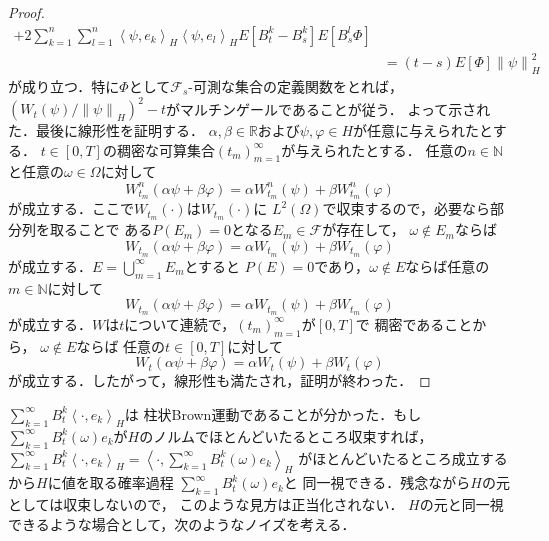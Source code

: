 \documentclass[dvipdfmx,autodetect-engine]{jsarticle}
\theoremstyle{remark}
\theoremstyle{definition}
\newcommand{\R}{\mathbb{R}}
\newcommand{\N}{\mathbb{N}}
\newcommand{\norm}[1]{\left\lVert#1\right\rVert}
\newcommand{\paren}[1]{\left( #1 \right)}
\newcommand{\iprod}[1]{\left\langle #1 \right\rangle}
\begin{document}
\begin{proof}
\begin{align}
         +
        2\sum_{k=1}^{n}\sum_{l=1}^{n} \iprod{\psi,e_{k}}_{H} \iprod{\psi,e_{l}}_{H}
        E\left[
             B_{t}^{k} -B_{s}^{k}
        \right]
        E\left[
            B_{s}^{l}\Phi
        \right]\\
        &= (t-s) E\left[\Phi \right] \norm{\psi}_{H}^{2}
    \end{align}
    が成り立つ．特に$\Phi$として$\mathcal{F}_{s}$-可測な集合の定義関数をとれば，
    $\paren{W_{t}(\psi) / \norm{\psi}_{H}}^{2} - t$がマルチンゲールであることが従う．
    よって示された．最後に線形性を証明する．
    $\alpha,\beta\in \R$および$\psi,\varphi \in H$が任意に与えられたとする．
    $t \in [0,T]$の稠密な可算集合$(t_{m})_{m=1}^{\infty}$が与えられたとする．
    任意の$n \in \N$と任意の$\omega \in \Omega$に対して
    \begin{equation}
        W_{t_{m}}^{n}(\alpha \psi + \beta \varphi) 
        = \alpha W_{t_{m}}^{n}(\psi) + \beta W_{t_{m}}^{n}(\varphi)
    \end{equation}
    が成立する．ここで$W_{t_{m}}(\cdot)$は$W_{t_{m}}(\cdot)$に
    $L^{2}(\Omega)$で収束するので，必要なら部分列を取ることで
    ある$P(E_{m})=0$となる$E_{m}\in \mathcal{F}$が存在して，
    $\omega \notin E_{m}$ならば
    \begin{equation}
        W_{t_{m}}(\alpha \psi + \beta \varphi) 
        = \alpha W_{t_{m}}(\psi) + \beta W_{t_{m}}(\varphi)
    \end{equation}
    が成立する．$E = \bigcup_{m=1}^{\infty} E_{m}$とすると
    $P(E) = 0$であり，$\omega \notin E$ならば任意の$m \in \N$に対して
    \begin{equation}
        W_{t_{m}}(\alpha \psi + \beta \varphi) 
        = \alpha W_{t_{m}}(\psi) + \beta W_{t_{m}}(\varphi)
    \end{equation}
    が成立する．$W$は$t$について連続で，$(t_{m})_{m=1}^{\infty}$が$[0,T]$で
    稠密であることから，
    $\omega \notin E$ならば
    任意の$t \in [0,T]$に対して
    \begin{equation}
        W_{t}(\alpha \psi + \beta \varphi) 
        = \alpha W_{t}(\psi) + \beta W_{t}(\varphi)
    \end{equation}
    が成立する．したがって，線形性も満たされ，証明が終わった．
\end{proof}

$\sum_{k=1}^{\infty} B_{t}^{k} \iprod{\cdot, e_{k}}_{H}$は
柱状Brown運動であることが分かった．もし$\sum_{k=1}^{\infty} 
B_{t}^{k}(\omega)e_{k}$が$H$のノルムでほとんどいたるところ収束すれば，
$\sum_{k=1}^{\infty} B_{t}^{k} \iprod{\cdot, e_{k}}_{H}
= \iprod{\cdot, \sum_{k=1}^{\infty} B_{t}^{k}(\omega)e_{k}}_{H}$
がほとんどいたるところ成立するから$H$に値を取る確率過程
$\sum_{k=1}^{\infty} B_{t}^{k}(\omega)e_{k}$と
同一視できる．残念ながら$H$の元としては収束しないので，
このような見方は正当化されない．
$H$の元と同一視できるような場合として，次のようなノイズを考える．
\end{document}
